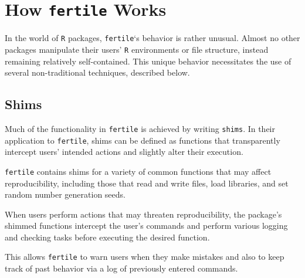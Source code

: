 \documentclass[12pt,twoside]{reedthesis}
\begin{document}
\hypertarget{how-fertile-works}{%
\section{\texorpdfstring{How \texttt{fertile} Works}{How fertile Works}}\label{how-fertile-works}}

In the world of \texttt{R} packages, \texttt{fertile}`s behavior is rather unusual. Almost no other packages manipulate their users' \texttt{R} environments or file structure, instead remaining relatively self-contained. This unique behavior necessitates the use of several non-traditional techniques, described below.

\hypertarget{shims}{%
\subsection{Shims}\label{shims}}

Much of the functionality in \texttt{fertile} is achieved by writing \texttt{shims}. In their application to \texttt{fertile}, shims can be defined as functions that transparently intercept users' intended actions and slightly alter their execution.

\texttt{fertile} contains shims for a variety of common functions that may affect reproducibility, including those that read and write files, load libraries, and set random number generation seeds.

When users perform actions that may threaten reproducibility, the package's shimmed functions intercept the user's commands and perform various logging and checking tasks before executing the desired function.

This allows \texttt{fertile} to warn users when they make mistakes and also to keep track of past behavior via a log of previously entered commands.
\end{document}
